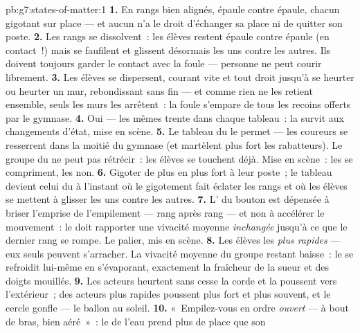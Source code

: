 \begin{solution}{pb:g7:states-of-matter:1}
\textbf{1.} En rangs bien alignés, épaule contre épaule, chacun
gigotant sur place --- et aucun n'a le droit d'échanger sa place ni
de quitter son poste.
\textbf{2.} Les rangs se dissolvent~: les élèves restent épaule
contre épaule (en contact~!) mais se faufilent et glissent désormais
les uns contre les autres. Ils doivent toujours garder le contact
avec la foule --- personne ne peut courir librement.
\textbf{3.} Les élèves se dispersent, courant vite et tout droit
jusqu'à se heurter ou heurter un mur, rebondissant sans fin --- et
comme rien ne les retient ensemble, seuls les murs les arrêtent~: la
foule s'empare de tous les recoins offerts par le gymnase.
\textbf{4.} Oui --- les mêmes trente dans chaque tableau~: la 
survit aux changements d'état, mise en scène.
\textbf{5.} Le tableau du  le permet --- les coureurs se
resserrent dans la moitié du gymnase (et martèlent plus fort les
rabatteurs). Le groupe du  ne peut pas rétrécir~: les élèves
se touchent déjà. Mise en scène~: les  se compriment, les 
non.
\textbf{6.} Gigoter de plus en plus fort à leur poste~; le tableau
devient celui du  à l'instant où le gigotement fait éclater
les rangs et où les élèves se mettent à glisser les uns contre les
autres.
\textbf{7.} L' du bouton est dépensée à briser l'emprise de
l'empilement --- rang après rang --- et non à accélérer le
mouvement~: le  doit rapporter une vivacité
moyenne \emph{inchangée} jusqu'à ce que le dernier rang se rompe. Le
palier, mis en scène.
\textbf{8.} Les élèves les \emph{plus rapides} --- eux seuls peuvent
s'arracher. La vivacité moyenne du groupe restant baisse~: le 
se refroidit lui-même en s'évaporant, exactement la fraîcheur de la
sueur et des doigts mouillés.
\textbf{9.} Les acteurs heurtent sans cesse la corde et la poussent
vers l'extérieur~; des acteurs plus rapides poussent plus fort et
plus souvent, et le cercle gonfle --- le ballon au soleil.
\textbf{10.} «~Empilez-vous en ordre \emph{ouvert} --- à bout de
bras, bien aéré~»~: le  de l'eau prend plus de place que son

\end{solution}
